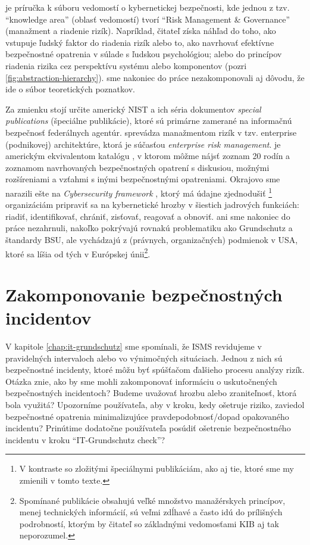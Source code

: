 \cite{CyBOK} je príručka k súboru vedomostí o kybernetickej bezpečnosti, kde jednou z tzv. \enquote{knowledge area} (oblasť
vedomostí) tvorí \enquote{Risk Management \& Governance} (manažment a riadenie rizík). Napríklad, čitateľ získa náhľad do toho, ako vstupuje ľudský faktor
do riadenia rizík alebo to, ako navrhovať efektívne bezpečnostné opatrenia v súlade s ľudskou psychológiou; alebo do princípov riadenia rizika cez perspektívu
systému alebo komponentov (pozri \ref{fig:abstraction-hierarchy}). \cite{CyBOK} sme nakoniec do práce nezakomponovali aj dôvodu, že ide o súbor teoretických poznatkov. 



Za zmienku stojí určite americký NIST a ich séria dokumentov \emph{special publications} (špeciálne publikácie), ktoré sú primárne zamerané na informačnú bezpečnosť
federálnych agentúr. \cite{NIST-800/39} sprevádza manažmentom rizík v tzv. enterprise (podnikovej) architektúre, ktorá je súčasťou \emph{enterprise risk management}.
\cite{NIST-800/53} je americkým ekvivalentom katalógu \cite{GSK}, v ktorom môžme nájsť zoznam 20 rodín a zoznamom navrhovaných bezpečnostných opatrení s diskusiou,
možnými rozšíreniami a vzťahmi s inými bezpečnostnými opatreniami. Okrajovo sme narazili ešte na \emph{Cybersecurity framework} \cite{CSF}, ktorý má údajne
zjednodušiť \footnote{V kontraste so zložitými špeciálnymi publikáciám, ako aj tie, ktoré sme my zmienili v tomto texte.} organizáciám pripraviť sa na kybernetické
hrozby v šiestich jadrových funkciách: riadiť, identifikovať, chrániť, zisťovať, reagovať a obnoviť. \cite{NIST-800/39} ani \cite{NIST-800/53} sme nakoniec do práce
nezahrnuli, nakoľko pokrývajú rovnakú problematiku ako Grundschutz a štandardy BSU, ale vychádzajú z (právnych, organizačných) podmienok v USA, ktoré sa líšia od tých
v Európskej únii\footnote{Spomínané publikácie obsahujú veľké množstvo manažérskych princípov, menej technických informácií, sú veľmi zdĺhavé a často idú do prílišných
podrobností, ktorým by čitateľ so základnými vedomosťami KIB aj tak neporozumel.}.

\section{Zakomponovanie bezpečnostných incidentov}

V kapitole \ref{chap:it-grundschutz} sme spomínali, že ISMS revidujeme v pravidelných intervaloch alebo vo výnimočných situáciach. Jednou z nich sú bezpečnostné
incidenty, ktoré môžu byť spúšťačom ďalšieho procesu analýzy rizík. Otázka znie, ako by sme mohli zakomponovať informáciu o uskutočnených bezpečnostných incidentoch?
Budeme uvažovať hrozbu alebo zraniteľnosť, ktorá bola využitá? Upozorníme používateľa, aby v kroku, kedy ošetruje riziko, zaviedol bezpečnostné opatrenia
minimalizujúce pravdepodobnosť/dopad opakovaného incidentu? Prinútime dodatočne používateľa posúdiť ošetrenie bezpečnostného incidentu v kroku
\enquote{IT-Grundschutz check}?

